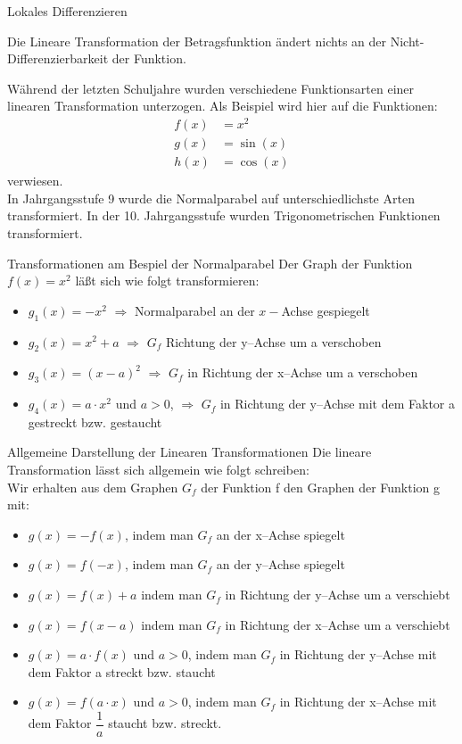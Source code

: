 \begin{section}{Lokales Differenzieren}
\begin{bem*}{}
Die Lineare Transformation der Betragsfunktion ändert nichts an der Nicht-Differenzierbarkeit der Funktion.
\end{bem*}
Während der letzten Schuljahre wurden verschiedene Funktionsarten einer linearen Transformation unterzogen. Als Beispiel wird hier auf die Funktionen: 
 \begin{equation*}
    \begin{split}
        f(x) &= x^2\\
        g(x) &= \sin{(x)}\\
        h(x) &= \cos{(x)}
    \end{split}
\end{equation*}
verwiesen.\\ 
In Jahrgangsstufe 9 wurde die Normalparabel auf unterschiedlichste Arten transformiert. In der 10. Jahrgangsstufe wurden Trigonometrischen Funktionen transformiert.
\begin{bsp*}{Transformationen am Bespiel der Normalparabel}{}
Der Graph der Funktion $f(x) = x^2$ läßt sich wie folgt transformieren:
\begin{itemize}
\item $g_1(x) = -x^2$ $\Longrightarrow$ Normalparabel an der $x-$Achse gespiegelt
\item $g_2(x) =   x^2 +a$ $\Longrightarrow$ $G_f$  Richtung der y--Achse um a verschoben
\item $g_3(x) =(x-a)^2$ $\Longrightarrow$ $G_f$ in Richtung der x--Achse um a verschoben
\item $g_4(x) =a\cdot x^2$ und $a>0$, $\Longrightarrow$ $G_f$ in Richtung der y--Achse mit dem Faktor a gestreckt bzw. gestaucht
\end{itemize}
\end{bsp*}

\begin{merke}{Allgemeine Darstellung der Linearen Transformationen} 
Die lineare Transformation lässt sich allgemein wie folgt schreiben:\\
Wir erhalten aus dem Graphen $G_f$ der Funktion f den Graphen der Funktion g mit:
\begin{itemize}
\item $g(x) = - f(x)$, indem man $G_f$ an der x--Achse spiegelt
\item $g(x) =f(-x)$, indem man $G_f$ an der y--Achse spiegelt
\item $g(x) = f(x) +a$ indem man $G_f$ in Richtung der y--Achse um a verschiebt
\item $g(x) =f(x-a)$ indem man $G_f$ in Richtung der x--Achse um a verschiebt
\item $g(x) =a\cdot f(x)$ und $a>0$, indem man $G_f$ in Richtung der y--Achse mit dem Faktor a streckt bzw. staucht
\item $g(x) =f(a\cdot x)$ und  $a>0$, indem man $G_f$ in Richtung der x--Achse mit dem Faktor $\dfrac{1}{a}$ staucht bzw. streckt.


\end{itemize}
\end{merke}
\end{section}
